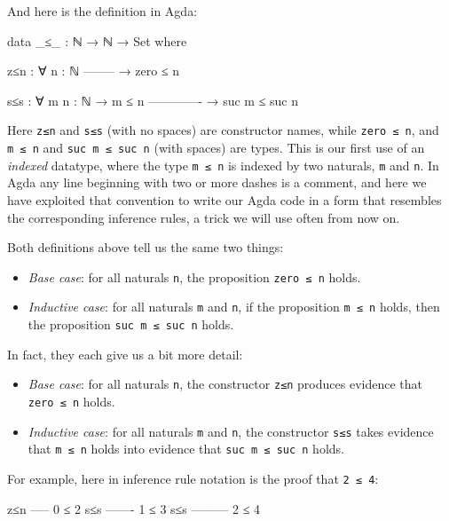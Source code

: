 And here is the definition in Agda:

\begin{fence}
\begin{code}
data _≤_ : ℕ → ℕ → Set where

  z≤n : ∀ {n : ℕ}
      --------
    → zero ≤ n

  s≤s : ∀ {m n : ℕ}
    → m ≤ n
      -------------
    → suc m ≤ suc n
\end{code}
\end{fence}

Here \texttt{z≤n} and \texttt{s≤s} (with no spaces) are constructor
names, while \texttt{zero\ ≤\ n}, and \texttt{m\ ≤\ n} and
\texttt{suc\ m\ ≤\ suc\ n} (with spaces) are types. This is our first
use of an \emph{indexed} datatype, where the type \texttt{m\ ≤\ n} is
indexed by two naturals, \texttt{m} and \texttt{n}. In Agda any line
beginning with two or more dashes is a comment, and here we have
exploited that convention to write our Agda code in a form that
resembles the corresponding inference rules, a trick we will use often
from now on.

Both definitions above tell us the same two things:

\begin{itemize}
\tightlist
\item
  \emph{Base case}: for all naturals \texttt{n}, the proposition
  \texttt{zero\ ≤\ n} holds.
\item
  \emph{Inductive case}: for all naturals \texttt{m} and \texttt{n}, if
  the proposition \texttt{m\ ≤\ n} holds, then the proposition
  \texttt{suc\ m\ ≤\ suc\ n} holds.
\end{itemize}

In fact, they each give us a bit more detail:

\begin{itemize}
\tightlist
\item
  \emph{Base case}: for all naturals \texttt{n}, the constructor
  \texttt{z≤n} produces evidence that \texttt{zero\ ≤\ n} holds.
\item
  \emph{Inductive case}: for all naturals \texttt{m} and \texttt{n}, the
  constructor \texttt{s≤s} takes evidence that \texttt{m\ ≤\ n} holds
  into evidence that \texttt{suc\ m\ ≤\ suc\ n} holds.
\end{itemize}

For example, here in inference rule notation is the proof that
\texttt{2\ ≤\ 4}:

\begin{myDisplay}
  z≤n -----
      0 ≤ 2
 s≤s -------
      1 ≤ 3
s≤s ---------
      2 ≤ 4
\end{myDisplay}


